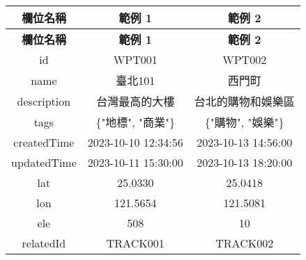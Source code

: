 \begin{longtable}{|c|c|c|}
  \hline
  \textbf{欄位名稱} & \textbf{範例 1} & \textbf{範例 2} \\
  \hline
  \endfirsthead
  \hline
  \textbf{欄位名稱} & \textbf{範例 1} & \textbf{範例 2} \\
  \hline
  \endhead
  
  id & WPT001 & WPT002 \\
  \hline
  name & 臺北101 & 西門町 \\
  \hline
  description & 台灣最高的大樓 & 台北的購物和娛樂區 \\
  \hline
  tags & \{"地標", "商業"\} & \{"購物", "娛樂"\} \\
  \hline
  createdTime & 2023-10-10 12:34:56 & 2023-10-13 14:56:00 \\
  \hline
  updatedTime & 2023-10-11 15:30:00 & 2023-10-13 18:20:00 \\
  \hline
  lat & 25.0330 & 25.0418 \\
  \hline
  lon & 121.5654 & 121.5081 \\
  \hline
  ele & 508 & 10 \\
  \hline
  relatedId & TRACK001 & TRACK002 \\
  \hline
\end{longtable}
